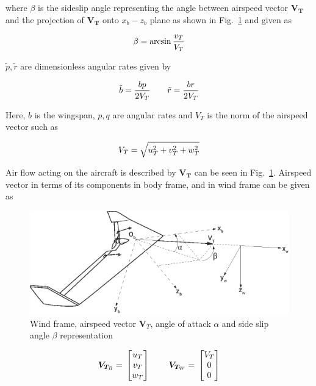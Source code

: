 where $\beta$ is the sideslip angle representing the angle between airspeed vector $\bm{V_T}$ and the projection of $\bm{V_T}$ onto $x_b-z_b$ plane as shown in Fig.~\ref{fig:windFrame} and given as 

\begin{equation}{\label{eqn:sideslipAngle}}
\beta = \arcsin{\frac{v_T}{V_T}}
\end{equation}

$\tilde{p}, \tilde{r}$ are dimensionless angular rates given by

 \begin{equation}{\label{eqn:dimensionlessAngularVelocties}}
\tilde{b}=\frac{bp}{2V_T} \qquad \tilde{r}=\frac{br}{2V_T}
\end{equation}

Here, $b$ is the wingspan, $p,q$ are angular rates and $V_T$ is the norm of the airspeed vector such as

\begin{equation}{\label{eqn:airspeedVector}}
V_T=\sqrt{u_T^2 + v_T^2 + w_T^2}
\end{equation}

Air flow acting on the aircraft is described by $\bm{V_T}$ can be seen in Fig.~\ref{fig:windFrame}. 
Airspeed vector in terms of its components in body frame, and in wind frame can be given as

\begin{figure}
\begin{center}
\includegraphics[width=15cm]{figures/ZagiWindframe}    %
\caption{Wind frame, airspeed vector $\bm{V}_T$, angle of attack $\alpha$ and side slip angle $\beta$ representation \cite{ducard2009fault}} 
\label{fig:windFrame}
\end{center}
\end{figure}

\begin{equation}{\label{eqn:airspeedComponents}}
\bm{V}_{\bm{T}_B}
=\,
\begin{bmatrix}
u_{T} \\
v_{T}\\
w_{T}\\
\end{bmatrix}
\qquad \,
\bm{V}_{\bm{T}_W}
=\,
\begin{bmatrix}
V_{T} \\
0\\
0\\
\end{bmatrix}
\end{equation}

